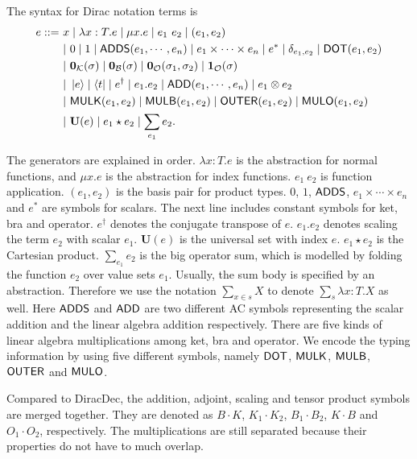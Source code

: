 \documentclass[runningheads]{llncs}
\begin{document}
\begin{definition}
    The syntax for Dirac notation terms is
    \begin{align*}
        e ::=\ & x \mid \lambda x : T.e \mid \mu x.e \mid e_1\ e_2 \mid (e_1, e_2) \\
        & |\ 0 \mid 1 \mid \mathsf{ADDS}(e_1, \cdots, e_n)  \mid e_1 \times \cdots \times e_n \mid e^*  \mid \delta_{e_1, e_2} \mid \mathsf{DOT}(e_1, e_2) \\
        & |\ \mathbf{0}_\mathcal{K}(\sigma) \mid \mathbf{0}_\mathcal{B}(\sigma) \mid \mathbf{0}_\mathcal{O}(\sigma_1, \sigma_2) \mid \mathbf{1}_\mathcal{O}(\sigma) \\
        & |\ \ket{e} \mid \bra{t} \mid e^\dagger \mid e_1.e_2 \mid \mathsf{ADD}(e_1, \cdots, e_n) \mid e_1 \otimes e_2 \\
        & |\ \mathsf{MULK}(e_1, e_2) \mid \mathsf{MULB}(e_1, e_2) \mid \mathsf{OUTER}(e_1, e_2) \mid \mathsf{MULO}(e_1, e_2) \\
        & |\ \mathbf{U}(e) \mid e_1 \star e_2 \mid \sum_{e_1} e_2.
    \end{align*}
\end{definition}
The generators are explained in order.
$\lambda x : T.e$ is the abstraction for normal functions, and $\mu x.e$ is the abstraction for index functions.
$e_1\ e_2$ is function application. 
$(e_1, e_2)$ is the basis pair for product types. $0$, $1$, $\mathsf{ADDS}$, $e_1 \times \cdots \times e_n$ and $e^*$ are symbols for scalars. 
The next line includes constant symbols for ket, bra and operator.
$e^\dagger$ denotes the conjugate transpose of $e$. $e_1.e_2$ denotes scaling the term $e_2$ with scalar $e_1$.
$\mathbf{U}(e)$ is the universal set with index $e$. $e_1 \star e_2$ is the Cartesian product. $\sum_{e_1} e_2$ is the big operator sum, which is modelled by folding the function $e_2$ over value sets $e_1$. Usually, the sum body is specified by an abstraction. Therefore we use the notation $\sum_{x \in s} X$ to denote $\sum_{s} \lambda x : T . X$ as well.
Here $\mathsf{ADDS}$ and $\mathsf{ADD}$ are two different AC symbols representing the scalar addition and the linear algebra addition respectively. 
There are five kinds of linear algebra multiplications among ket, bra and operator. We encode the typing information by using five different symbols, namely $\mathsf{DOT}$, $\mathsf{MULK}$, $\mathsf{MULB}$, $\mathsf{OUTER}$ and $\mathsf{MULO}$. 

Compared to DiracDec, the addition, adjoint, scaling and tensor product symbols are merged together.
They are denoted as $B\cdot K$, $K_1 \cdot K_2$, $B_1 \cdot B_2$, $K \cdot B$ and $O_1 \cdot O_2$, respectively.
The multiplications are still separated because their properties do not have to much overlap.
\end{document}
